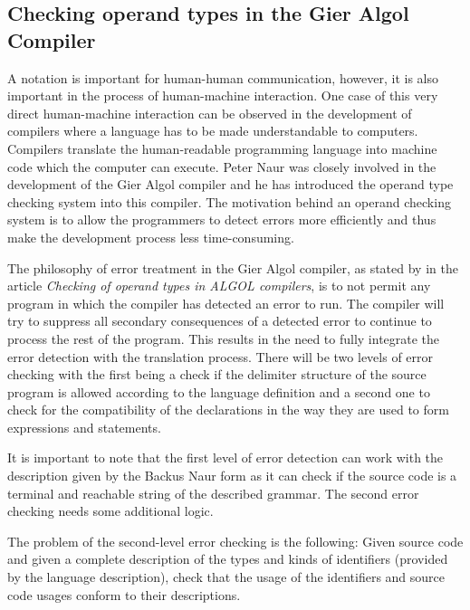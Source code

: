 \documentclass{article}
\begin{document}
\subsection{Checking operand types in the Gier Algol Compiler}
A notation is important for human-human communication, however, it is also important in the process of human-machine interaction. One case of this very direct human-machine interaction can be observed in the development of compilers where a language has to be made understandable to computers. Compilers translate the human-readable programming language into machine code which the computer can execute. Peter Naur was closely involved in the development of the Gier Algol compiler and he has introduced the operand type checking system into this compiler. The motivation behind an operand checking system is to allow the programmers to detect errors more efficiently and thus make the development process less time-consuming. 

The philosophy of error treatment in the Gier Algol compiler, as stated by \cite{naur1965checking} in the article \textit{Checking of operand types in ALGOL compilers}, is to not permit any program in which the compiler has detected an error to run. The compiler will try to suppress all secondary consequences of a detected error to continue to process the rest of the program. This results in the need to fully integrate the error detection with the translation process. There will be two levels of error checking with the first being a check if the delimiter structure of the source program is allowed according to the language definition and a second one to check for the compatibility of the declarations in the way they are used to form expressions and statements.

It is important to note that the first level of error detection can work with the description given by the Backus Naur form as it can check if the source code is a terminal and reachable string of the described grammar. The second error checking needs some additional logic. 

The problem of the second-level error checking is the following: Given source code and given a complete description of the types and kinds of identifiers (provided by the language description), check that the usage of the identifiers and source code usages conform to their descriptions.
\end{document}
